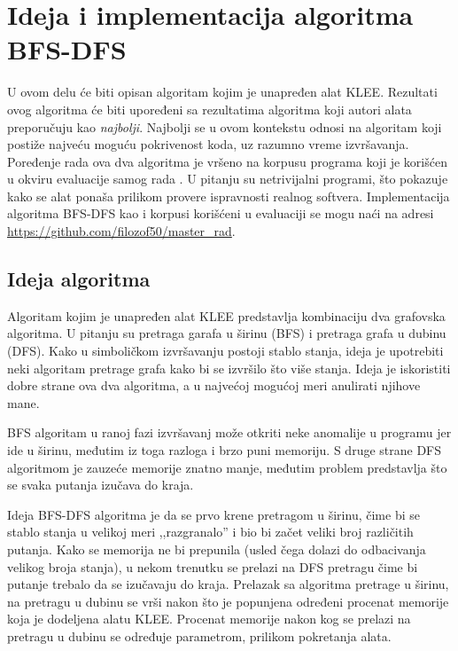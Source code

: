 \documentclass[12pt,oneside]{memoir}
\begin{document}
\chapter{Ideja i implementacija algoritma BFS-DFS} \label{algoritam}
U ovom delu će biti opisan algoritam kojim je unapređen alat KLEE. Rezultati ovog algoritma će biti upoređeni sa rezultatima algoritma koji autori alata preporučuju kao \textit{najbolji}. Najbolji se u ovom kontekstu odnosi na algoritam koji postiže najveću moguću pokrivenost koda, uz razumno vreme izvršavanja. Poređenje rada ova dva algoritma je vršeno na korpusu programa koji je korišćen u okviru evaluacije samog rada \cite{klee}. U pitanju su netrivijalni programi, što pokazuje kako se alat ponaša prilikom provere ispravnosti realnog softvera. Implementacija algoritma BFS-DFS kao i korpusi korišćeni u evaluaciji se mogu naći na adresi \url{https://github.com/filozof50/master_rad}.

\section{Ideja algoritma} \label{ideja_algoritma}
Algoritam kojim je unapređen alat KLEE predstavlja kombinaciju dva grafovska algoritma. U pitanju su pretraga garafa u širinu (BFS) i pretraga grafa u dubinu (DFS). Kako u simboličkom izvršavanju postoji stablo stanja, ideja je upotrebiti neki algoritam pretrage grafa kako bi se izvršilo što više stanja. Ideja je iskoristiti dobre strane ova dva algoritma, a u najvećoj mogućoj meri anulirati njihove mane. 

BFS algoritam u ranoj fazi izvršavanj može otkriti neke anomalije u programu jer ide u širinu, međutim iz toga razloga i brzo puni memoriju. S druge strane DFS algoritmom je zauzeće memorije znatno manje, međutim problem predstavlja što se svaka putanja izučava do kraja. 

Ideja BFS-DFS algoritma je da se prvo krene pretragom u širinu, čime bi se stablo stanja u velikoj meri ,,razgranalo'' i bio bi začet veliki broj različitih putanja. Kako se memorija ne bi prepunila (usled čega dolazi do odbacivanja velikog broja stanja), u nekom trenutku se prelazi na DFS pretragu čime bi putanje trebalo da se izučavaju do kraja. Prelazak sa algoritma pretrage u širinu, na pretragu u dubinu se vrši nakon što je popunjena određeni procenat memorije koja je dodeljena alatu KLEE. Procenat memorije nakon kog se prelazi na pretragu u dubinu se određuje parametrom, prilikom pokretanja alata. 
\end{document}
